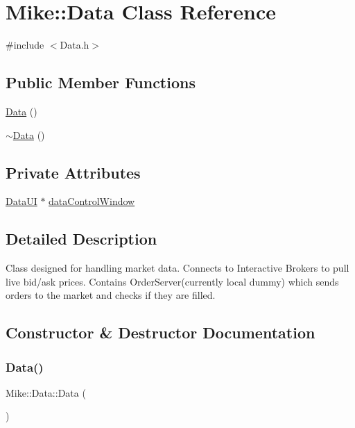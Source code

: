 \hypertarget{class_mike_1_1_data}{}\section{Mike\+:\+:Data Class Reference}
\label{class_mike_1_1_data}


{\ttfamily \#include $<$Data.\+h$>$}

\subsection*{Public Member Functions}
\begin{DoxyCompactItemize}
\item 
\hyperlink{class_mike_1_1_data_afb88d046472d9a49f9ea16d6773d9def}{Data} ()
\item 
\hyperlink{class_mike_1_1_data_aca3a0c18d791cca46c27c86caf3059cf}{$\sim$\+Data} ()
\end{DoxyCompactItemize}
\subsection*{Private Attributes}
\begin{DoxyCompactItemize}
\item 
\hyperlink{class_mike_1_1_data_u_i}{Data\+UI} $\ast$ \hyperlink{class_mike_1_1_data_a615c7c93b1c7addbe8e888ddbed837a4}{data\+Control\+Window}
\end{DoxyCompactItemize}


\subsection{Detailed Description}
Class designed for handling market data. Connects to Interactive Brokers to pull live bid/ask prices. Contains Order\+Server(currently local dummy) which sends orders to the market and checks if they are filled. 

\subsection{Constructor \& Destructor Documentation}
\mbox{\label{class_mike_1_1_data_afb88d046472d9a49f9ea16d6773d9def}} 
\subsubsection{\texorpdfstring{Data()}{Data()}}
{\footnotesize\ttfamily Mike\+::\+Data\+::\+Data (\begin{DoxyParamCaption}{ }\end{DoxyParamCaption})}

